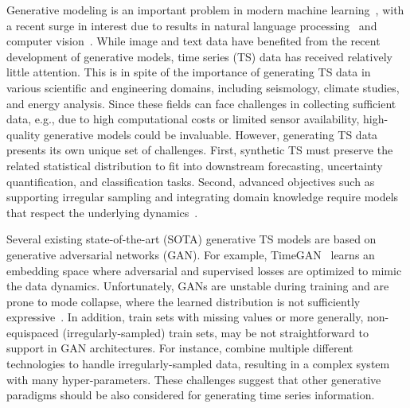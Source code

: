 \documentclass{article} %
\begin{document}
Generative modeling is an important problem in modern machine learning~\citep{kingma14auto, goodfellow2014generative, sohl2015deep}, with a recent surge in interest due to results in natural language processing~\citep{brown2020language} and computer vision~\citep{rombach2022high, ramesh2022hierarchical}. 
While image and text data have benefited from the recent development of generative models, time series (TS) data has received relatively little attention. 
This is in spite of the importance of generating TS data in various scientific and engineering domains, including seismology, climate studies, and energy analysis. 
Since these fields can face challenges in collecting sufficient data, e.g., due to high computational costs or limited sensor availability, high-quality generative models could be invaluable. 
However, generating TS data presents its own unique set of challenges. 
First, synthetic TS must preserve the related statistical distribution to fit into downstream forecasting, uncertainty quantification, and classification tasks. 
Second, advanced objectives such as supporting irregular sampling and integrating domain knowledge require models that respect the underlying dynamics~\citep{che2018recurrent, kidger2020neural, jeon2022gt, coletta2023constrained}. 

Several existing state-of-the-art (SOTA) generative TS models are based on generative adversarial networks (GAN). 
For example, TimeGAN~\citep{yoon2019time} learns an embedding space where adversarial and supervised losses are optimized to mimic the data dynamics. 
Unfortunately, GANs are unstable during training and are prone to mode collapse, where the learned distribution is not sufficiently expressive~\citep{goodfellow2016nips, lucic2018gans, saxena2021generative}. 
In addition, train sets with missing values or more generally, non-equispaced (irregularly-sampled) train sets, may be not straightforward to support in GAN architectures.
For instance, \cite{jeon2022gt} combine multiple different technologies to handle irregularly-sampled data, resulting in a complex system with many hyper-parameters. 
These challenges suggest that other generative paradigms should be also considered for generating time series information.
\end{document}
